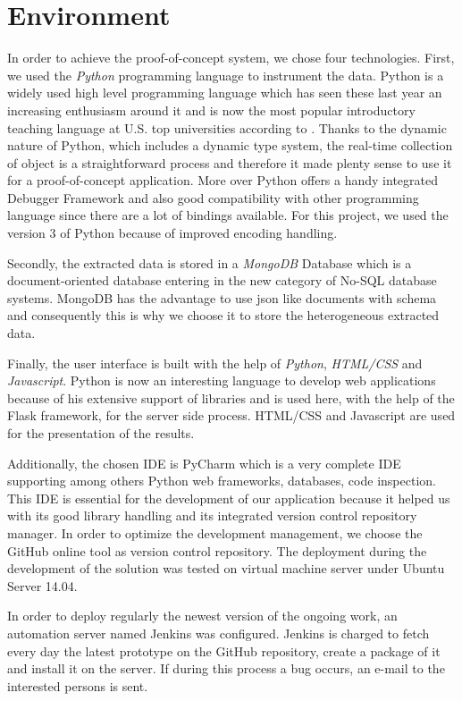 \section{Environment}
In order to achieve the proof-of-concept system, we chose four technologies. First, we used the \textit{Python} programming language to instrument the data. Python is a widely used high level programming language which has seen these last year an increasing enthusiasm around it and is now the most popular introductory teaching language at U.S. top universities according to \cite{Guo2014}. Thanks to the dynamic nature of Python, which includes a dynamic type system, the real-time collection of object is a straightforward process and therefore it made plenty sense to use it for a proof-of-concept application. More over Python offers a handy integrated Debugger Framework and also good compatibility with other programming language since there are a lot of bindings available. For this project, we used the version 3 of Python because of improved encoding handling.

Secondly, the extracted data is stored in a \textit{MongoDB} Database which is a document-oriented database entering in the new category of No-SQL database systems. MongoDB has the advantage to use \gls{json} like documents with schema and consequently this is why we choose it to store the heterogeneous extracted data.

Finally, the user interface is built with the help of \textit{Python}, \textit{HTML/CSS} and \textit{Javascript}. Python is now an interesting language to develop web applications because of his extensive support of libraries and is used here, with the help of the Flask framework, for the server side process. HTML/CSS and Javascript are used for the presentation of the results.

Additionally, the chosen IDE is PyCharm which is a very complete IDE supporting among others Python web frameworks, databases, code inspection. This IDE is essential for the development of our application because it helped us with its good library handling and its integrated version control repository manager. In order to optimize the development management, we choose the GitHub online tool as version control repository. The deployment during the development of the solution was tested on virtual machine server under Ubuntu Server 14.04. 

In order to deploy regularly the newest version of the ongoing work, an automation server named Jenkins was configured. Jenkins is charged to fetch every day the latest prototype on the GitHub repository, create a package of it and install it on the server. If during this process a bug occurs, an e-mail to the interested persons is sent.

